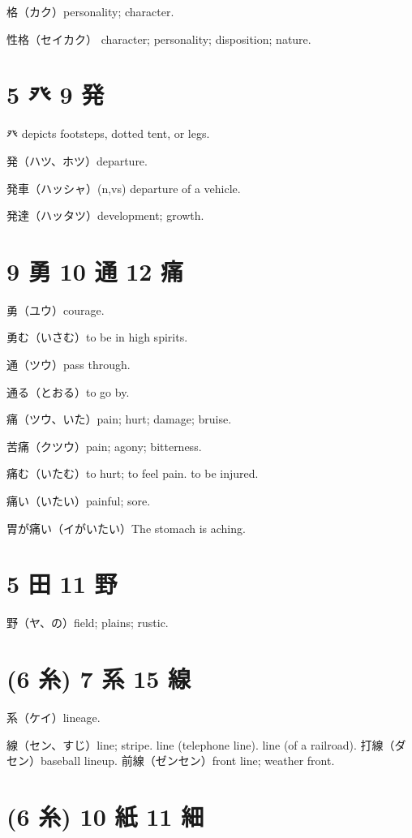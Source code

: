 格（カク）personality; character.

性格（セイカク）
character; personality; disposition; nature.

\section{5 癶 9 発}

癶 depicts footsteps, dotted tent, or legs.

発（ハツ、ホツ）departure.

発車（ハッシャ）(n,vs) departure of a vehicle.

発達（ハッタツ）development; growth.

\section{9 勇 10 通 12 痛}

勇（ユウ）courage.

勇む（いさむ）to be in high spirits.

通（ツウ）pass through.

通る（とおる）to go by.

痛（ツウ、いた）pain; hurt; damage; bruise.

苦痛（クツウ）pain; agony; bitterness.

痛む（いたむ）to hurt; to feel pain. to be injured.

痛い（いたい）painful; sore.

胃が痛い（イがいたい）The stomach is aching.

\section{5 田 11 野}

野（ヤ、の）field; plains; rustic.

\section{(6 糸) 7 系 15 線}

系（ケイ）lineage.

線（セン、すじ）line; stripe.
line (telephone line).
line (of a railroad).
打線（ダセン）baseball lineup.
前線（ゼンセン）front line; weather front.

\section{(6 糸) 10 紙 11 細}

